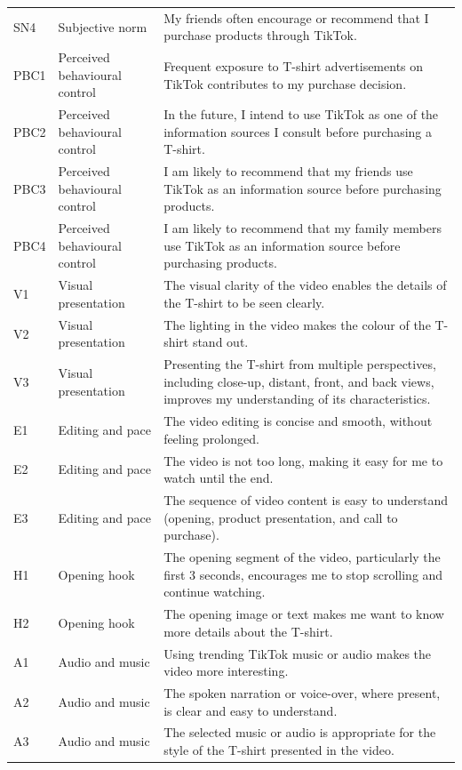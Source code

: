 \documentclass[10pt,a4paper]{article}
\begin{document}
\begin{longtable}{@{}L{0.10\textwidth}L{0.24\textwidth}L{0.58\textwidth}@{}}
SN4 & Subjective norm & My friends often encourage or recommend that I purchase products through TikTok. \\
\addlinespace[2pt]
PBC1 & Perceived behavioural control & Frequent exposure to T-shirt advertisements on TikTok contributes to my purchase decision. \\
PBC2 & Perceived behavioural control & In the future, I intend to use TikTok as one of the information sources I consult before purchasing a T-shirt. \\
PBC3 & Perceived behavioural control & I am likely to recommend that my friends use TikTok as an information source before purchasing products. \\
PBC4 & Perceived behavioural control & I am likely to recommend that my family members use TikTok as an information source before purchasing products. \\
\addlinespace[2pt]
V1 & Visual presentation & The visual clarity of the video enables the details of the T-shirt to be seen clearly. \\
V2 & Visual presentation & The lighting in the video makes the colour of the T-shirt stand out. \\
V3 & Visual presentation & Presenting the T-shirt from multiple perspectives, including close-up, distant, front, and back views, improves my understanding of its characteristics. \\
\addlinespace[2pt]
E1 & Editing and pace & The video editing is concise and smooth, without feeling prolonged. \\
E2 & Editing and pace & The video is not too long, making it easy for me to watch until the end. \\
E3 & Editing and pace & The sequence of video content is easy to understand (opening, product presentation, and call to purchase). \\
\addlinespace[2pt]
H1 & Opening hook & The opening segment of the video, particularly the first 3 seconds, encourages me to stop scrolling and continue watching. \\
H2 & Opening hook & The opening image or text makes me want to know more details about the T-shirt. \\
\addlinespace[2pt]
A1 & Audio and music & Using trending TikTok music or audio makes the video more interesting. \\
A2 & Audio and music & The spoken narration or voice-over, where present, is clear and easy to understand. \\
A3 & Audio and music & The selected music or audio is appropriate for the style of the T-shirt presented in the video. \\

\end{longtable}
\end{document}
